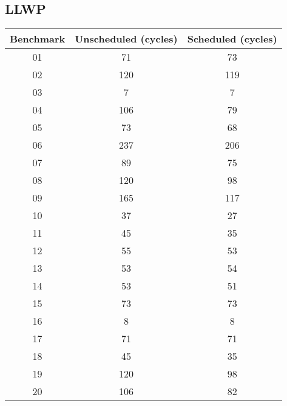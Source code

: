 \documentclass{article}
\begin{document}
\subsection{LLWP}
\begin{center}
    \begin{tabular} {|c | c | c|}
        \hline
        Benchmark & Unscheduled (cycles)  & Scheduled (cycles) \\ \hline \hline
        01 & 71 & 73 \\ \hline
        02 & 120 & 119 \\ \hline
        03 & 7 & 7 \\ \hline
        04 & 106 & 79 \\ \hline
        05 & 73 & 68 \\ \hline
        06 & 237 & 206 \\ \hline
        07 & 89 & 75 \\ \hline
        08 & 120 & 98 \\ \hline
        09 & 165 & 117 \\ \hline
        10 & 37 & 27 \\ \hline
        11 & 45 & 35 \\ \hline
        12 & 55 & 53 \\ \hline
        13 & 53 & 54 \\ \hline
        14 & 53 & 51 \\ \hline
        15 & 73 & 73 \\ \hline
        16 & 8 & 8 \\ \hline
        17 & 71 & 71 \\ \hline
        18 & 45 & 35 \\ \hline
        19 & 120 & 98 \\ \hline
        20 & 106 & 82 \\ 
        \hline
    \end{tabular}
\end{center}
\end{document}
